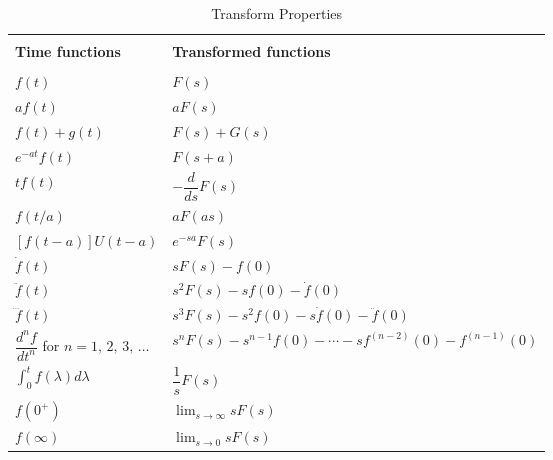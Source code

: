 \documentclass[letterpaper, 11pt]{article}
\begin{document}
\newpage
\vfill
\begin{table}
    \centering
    \caption{Transform Properties}
    \begin{tabular}{ll}
         \toprule
         \vspace{-50pt}\\
         \textbf{Time functions} & \textbf{Transformed functions}\\
         \vspace{-40pt}\\
         \hline
         \(f(t)\) & \(F(s)\)\\
         \(af(t)\) & \(aF(s)\)\\
         \(f(t) + g(t)\) & \(F(s) + G(s)\)\\
         \(e^{-at}f(t)\) & \(F(s+a)\)\\
         \(tf(t)\) & \(-\dfrac{d}{ds}F(s)\)\\
         \(f(t/a)\) & \(aF(as)\)\\
         \(\left[f(t-a)\right]U(t-a)\) & \(e^{-sa}F(s)\)\\
         \(\dot{f}(t)\) & \(sF(s) - f(0)\)\\
         \(\ddot{f}(t)\) & \(s^2F(s) - sf(0) - \dot{f}(0)\)\\
         \(\dddot{f}(t)\) & \(s^3F(s) - s^2f(0) - s\dot{f}(0) -\ddot{f}(0)\)\\
         \(\dfrac{d^nf}{dt^n}\) for \(n=1,\,2,\,3,\,\dots\) \hspace{10pt} & \(s^nF(s) -s^{n-1}f(0) - \cdots - sf^{(n-2)}(0) - f^{(n-1)}(0)\)\\
         \(\displaystyle\int_0^tf(\lambda) d\lambda\) & \(\dfrac{1}{s}F(s)\)\\        
         \(f(0^+)\) & \(\displaystyle\lim_{s\to\infty} sF(s)\)\\
         \(f(\infty)\) & \(\displaystyle\lim_{s\to0} sF(s)\)\\
         \bottomrule
    \end{tabular}        
\end{table}
\vfill
\end{document}

